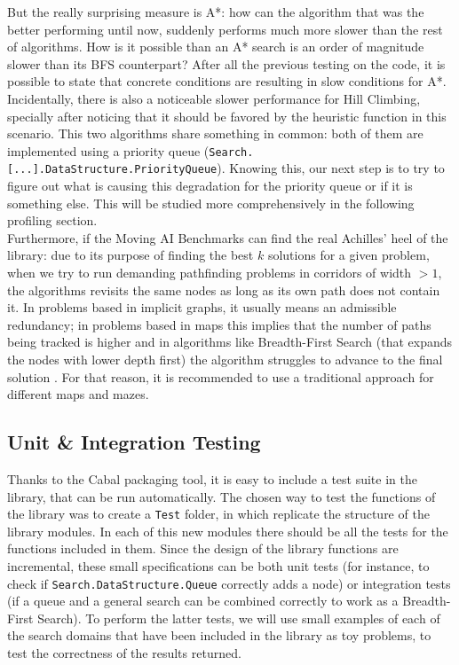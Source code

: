 But the really surprising measure is A*: how can the algorithm that was the
better performing until now, suddenly performs much more slower than the rest
of algorithms. How is it possible than an A* search is an order of magnitude
slower than its BFS counterpart? After all the previous testing on the code, it
is possible to state that concrete conditions are resulting in slow conditions
for A*. Incidentally, there is also a noticeable slower performance for Hill
Climbing, specially after noticing that it should be favored by the heuristic
function in this scenario. This two algorithms share something in common: both
of them are implemented using a priority queue
(\texttt{Search.[...].DataStructure.PriorityQueue}). Knowing this, our next
step is to try to figure out what is causing this degradation for the priority
queue or if it is something else. This will be studied more comprehensively in
the following profiling section.\\

Furthermore, if the Moving AI Benchmarks can find the real Achilles' heel of
the library: due to its purpose of finding the best $k$ solutions for a given
problem, when we try to run demanding pathfinding problems in corridors of
width $>1$, the algorithms revisits the same nodes as long as its own path does
not contain it. In problems based in implicit graphs, it usually means an
admissible redundancy; in problems based in maps this implies that the number
of paths being tracked is higher and in algorithms like Breadth-First Search
(that expands the nodes with lower depth first) the algorithm struggles to
advance to the final solution \cite{dechter-2012-search}. For that reason, it
is recommended to use a traditional approach for different maps and mazes.

\subsection{Unit \& Integration Testing}

Thanks to the Cabal packaging tool, it is easy to include a test suite in the
library, that can be run automatically. The chosen way to test the functions of
the library was to create a \texttt{Test} folder, in which replicate the
structure of the library modules. In each of this new modules there should be
all the tests for the functions included in them. Since the design of the
library functions are incremental, these small specifications can be both unit
tests (for instance, to check if \texttt{Search.DataStructure.Queue} correctly
adds a node) or integration tests (if a queue and a general search can be
combined correctly to work as a Breadth-First Search). To perform the latter
tests, we will use small examples of each of the search domains that have been
included in the library as toy problems, to test the correctness of the results
returned.\\

